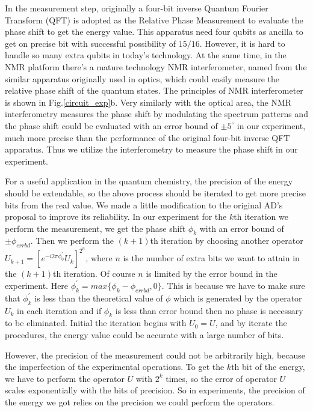 \def\CTeXPreproc{Created by ctex v0.2.12, don't edit!}\documentclass[twocolumn,showpacs,twoside,10pt,superscriptaddress,prl]{revtex4}
\begin{document}
In the measurement step, originally a four-bit inverse Quantum
Fourier Transform (QFT) is adopted as the Relative Phase Measurement
to evaluate the phase shift to get the energy value. This apparatus
need four qubits as ancilla to get on precise bit with successful
possibility of $15/16$\cite{qcqi}. However, it is hard to handle so
many extra qubits in today's technology. At the same time, in the
NMR platform there's a mature technology NMR interferometer, named
from the similar apparatus originally used in optics, which could
easily measure the relative phase shift of the quantum
states\cite{du_geophase,peng_comple}. The principles of NMR
interferometer is shown in Fig.\ref{circuit_exp}b. Very similarly
with the optical area, the NMR interferometry measures the phase
shift by modulating the spectrum patterns and the phase shift could
be evaluated with an error bound of $\pm5^\circ$ in our experiment,
much more precise than the performance of the original four-bit
inverse QFT apparatus. Thus we utilize the interferometry to measure
the phase shift in our experiment.


For a useful application in the quantum chemistry, the precision of
the energy should be extendable, so the above process should be
iterated to get more precise bits from the real value. We made a
little modification to the original AD's proposal to improve its
reliability. In our experiment for the $k$th iteration we perform
the measurement, we get the phase shift $\phi_k$ with an error bound
of $\pm\phi_{errbd}$. Then we perform the $(k+1)$th iteration by
choosing another operator $U_{k+1}=[e^{-i2\pi\phi^{'}_0}U_k]^{2^n}$,
where $n$ is the number of extra bits we want to attain in the
$(k+1)$th iteration. Of course $n$ is limited by the error bound in
the experiment. Here $\phi^{'}_k=max\{\phi_k-\phi_{errbd},0\}$. This
is because we have to make sure that $\phi^{'}_k$ is less than the
theoretical value of $\phi$ which is generated by the operator $U_k$
in each iteration and if $\phi_k$ is less than error bound then no
phase is necessary to be eliminated. Initial the iteration begins
with $U_0=U$, and by iterate the procedures, the energy value could
be accurate with a large number of bits.

However, the precision of the measurement could not be arbitrarily
high, because the imperfection of the experimental operations. To
get the $k$th bit of the energy, we have to perform the operator $U$
 with $2^k$ times, so the error of operator $U$ scales exponentially
 with the bits of precision. So in experiments, the precision of the
 energy we got relies on the precision we could perform the
 operators.
\end{document}
